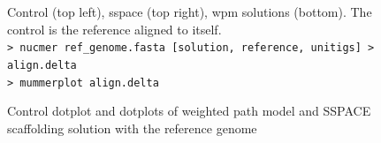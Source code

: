 \documentclass[12pt]{article}
\begin{document}
\begin{figure}[h!]
\begin{center}
{
}
\end{center}
\caption{Control dotplot and dotplots of weighted path model and SSPACE scaffolding solution with the reference genome}
\footnotesize Control (top left), sspace (top right), wpm solutions (bottom). The control is the reference aligned to itself.\\ \texttt{> nucmer ref\_genome.fasta [solution, reference, unitigs] > align.delta} \\ \texttt{> mummerplot align.delta}
\label{dotplotsols}
\end{figure}
\end{document}
